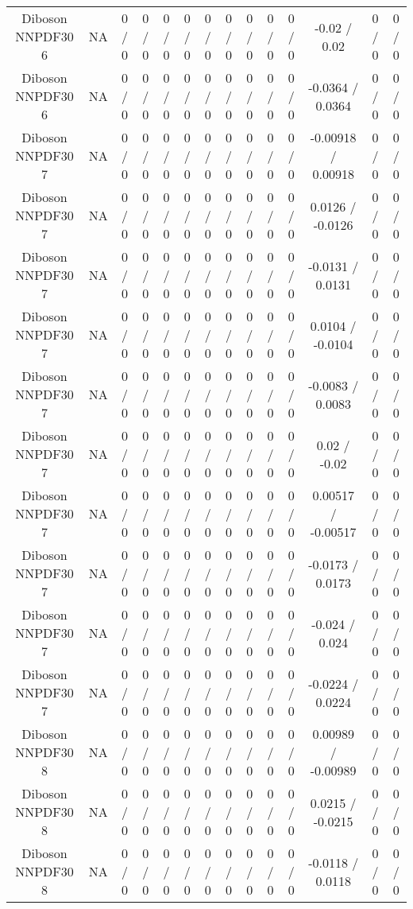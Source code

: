 \documentclass[10pt]{article}
\begin{document}
\begin{table}[htbp]
\begin{center}
\begin{tabular}{|c|c|c|c|c|c|c|c|c|c|c|c|c|c|}
  Diboson NNPDF30 6 &    NA    & 0 / 0 & 0 / 0 & 0 / 0 & 0 / 0 & 0 / 0 & 0 / 0 & 0 / 0 & 0 / 0 & 0 / 0 & -0.02 / 0.02 & 0 / 0 & 0 / 0 \\ 
  Diboson NNPDF30 6 &    NA    & 0 / 0 & 0 / 0 & 0 / 0 & 0 / 0 & 0 / 0 & 0 / 0 & 0 / 0 & 0 / 0 & 0 / 0 & -0.0364 / 0.0364 & 0 / 0 & 0 / 0 \\ 
  Diboson NNPDF30 7 &    NA    & 0 / 0 & 0 / 0 & 0 / 0 & 0 / 0 & 0 / 0 & 0 / 0 & 0 / 0 & 0 / 0 & 0 / 0 & -0.00918 / 0.00918 & 0 / 0 & 0 / 0 \\ 
  Diboson NNPDF30 7 &    NA    & 0 / 0 & 0 / 0 & 0 / 0 & 0 / 0 & 0 / 0 & 0 / 0 & 0 / 0 & 0 / 0 & 0 / 0 & 0.0126 / -0.0126 & 0 / 0 & 0 / 0 \\ 
  Diboson NNPDF30 7 &    NA    & 0 / 0 & 0 / 0 & 0 / 0 & 0 / 0 & 0 / 0 & 0 / 0 & 0 / 0 & 0 / 0 & 0 / 0 & -0.0131 / 0.0131 & 0 / 0 & 0 / 0 \\ 
  Diboson NNPDF30 7 &    NA    & 0 / 0 & 0 / 0 & 0 / 0 & 0 / 0 & 0 / 0 & 0 / 0 & 0 / 0 & 0 / 0 & 0 / 0 & 0.0104 / -0.0104 & 0 / 0 & 0 / 0 \\ 
  Diboson NNPDF30 7 &    NA    & 0 / 0 & 0 / 0 & 0 / 0 & 0 / 0 & 0 / 0 & 0 / 0 & 0 / 0 & 0 / 0 & 0 / 0 & -0.0083 / 0.0083 & 0 / 0 & 0 / 0 \\ 
  Diboson NNPDF30 7 &    NA    & 0 / 0 & 0 / 0 & 0 / 0 & 0 / 0 & 0 / 0 & 0 / 0 & 0 / 0 & 0 / 0 & 0 / 0 & 0.02 / -0.02 & 0 / 0 & 0 / 0 \\ 
  Diboson NNPDF30 7 &    NA    & 0 / 0 & 0 / 0 & 0 / 0 & 0 / 0 & 0 / 0 & 0 / 0 & 0 / 0 & 0 / 0 & 0 / 0 & 0.00517 / -0.00517 & 0 / 0 & 0 / 0 \\ 
  Diboson NNPDF30 7 &    NA    & 0 / 0 & 0 / 0 & 0 / 0 & 0 / 0 & 0 / 0 & 0 / 0 & 0 / 0 & 0 / 0 & 0 / 0 & -0.0173 / 0.0173 & 0 / 0 & 0 / 0 \\ 
  Diboson NNPDF30 7 &    NA    & 0 / 0 & 0 / 0 & 0 / 0 & 0 / 0 & 0 / 0 & 0 / 0 & 0 / 0 & 0 / 0 & 0 / 0 & -0.024 / 0.024 & 0 / 0 & 0 / 0 \\ 
  Diboson NNPDF30 7 &    NA    & 0 / 0 & 0 / 0 & 0 / 0 & 0 / 0 & 0 / 0 & 0 / 0 & 0 / 0 & 0 / 0 & 0 / 0 & -0.0224 / 0.0224 & 0 / 0 & 0 / 0 \\ 
  Diboson NNPDF30 8 &    NA    & 0 / 0 & 0 / 0 & 0 / 0 & 0 / 0 & 0 / 0 & 0 / 0 & 0 / 0 & 0 / 0 & 0 / 0 & 0.00989 / -0.00989 & 0 / 0 & 0 / 0 \\ 
  Diboson NNPDF30 8 &    NA    & 0 / 0 & 0 / 0 & 0 / 0 & 0 / 0 & 0 / 0 & 0 / 0 & 0 / 0 & 0 / 0 & 0 / 0 & 0.0215 / -0.0215 & 0 / 0 & 0 / 0 \\ 
  Diboson NNPDF30 8 &    NA    & 0 / 0 & 0 / 0 & 0 / 0 & 0 / 0 & 0 / 0 & 0 / 0 & 0 / 0 & 0 / 0 & 0 / 0 & -0.0118 / 0.0118 & 0 / 0 & 0 / 0 \\ 

\end{tabular}
\end{center}
\end{table}
\end{document}
